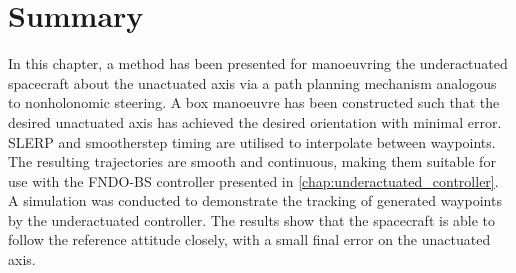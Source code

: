 \newpage

\section{Summary}
In this chapter, a method has been presented for manoeuvring the underactuated spacecraft about the unactuated axis via a path planning mechanism analogous to nonholonomic steering. A box manoeuvre has been constructed such that the desired unactuated axis has achieved the desired orientation with minimal error. SLERP and smootherstep timing are utilised to interpolate between waypoints. The resulting trajectories are smooth and continuous, making them suitable for use with the FNDO-BS controller presented in \autoref{chap:underactuated_controller}. A simulation was conducted to demonstrate the tracking of generated waypoints by the underactuated controller.  The results show that the spacecraft is able to follow the reference attitude closely, with a small final error on the unactuated axis.



